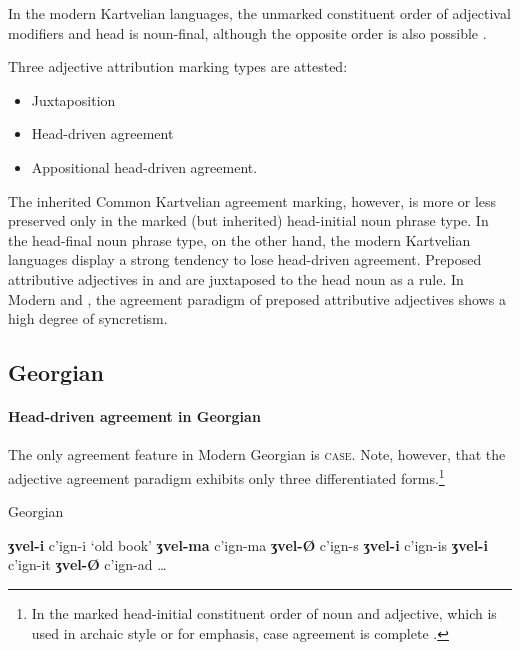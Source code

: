 In the modern Kartvelian languages, the unmarked constituent order of adjectival modifiers and head is noun-final, although the opposite order is also possible \citep[56]{harris1991a}.

Three adjective attribution marking types are attested:
\begin{itemize}
\item Juxtaposition
\item Head\hyp{}driven agreement
\item Appositional head\hyp{}driven agreement.
\end{itemize}
The inherited Common Kartvelian agreement marking, however, is more or less preserved only in the marked (but inherited) head-initial noun phrase type. In the head-final noun phrase type, on the other hand, the modern Kartvelian languages display a strong tendency to lose head\hyp{}driven agreement. Preposed attributive adjectives in  and  are juxtaposed to the head noun as a rule. In Modern  and , the agreement paradigm of preposed attributive adjectives shows a high degree of syncretism.

\subsection{Georgian}\label{georgian synchr}
\paragraph*{Head\hyp{}driven agreement in Georgian}
The only agreement feature in Modern Georgian is \textsc{case}. Note, however, that the adjective agreement paradigm exhibits only three differentiated forms.\footnote{In the marked head-initial constituent order of noun and adjective, which is used in archaic style or for emphasis, case agreement is complete \citep[59]{tuite1998}.}
\begin{exe}
\settowidth{}
\label{georgian old}
\ex \rm{Georgian \citep[236]{aronson1991}}
\begin{xlist}
\ex \textbf{ʒvel-i} c'ign-i		\rm{‘old book’}	
\ex \textbf{ʒvel-ma} c'ign-ma				
\ex \textbf{ʒvel-Ø} c'ign-s					
\ex \textbf{ʒvel-i} c'ign-is					
\ex \textbf{ʒvel-i} c'ign-it					
\ex \textbf{ʒvel-Ø} c'ign-ad					
\ex \dots
\end{xlist}
\end{exe}

